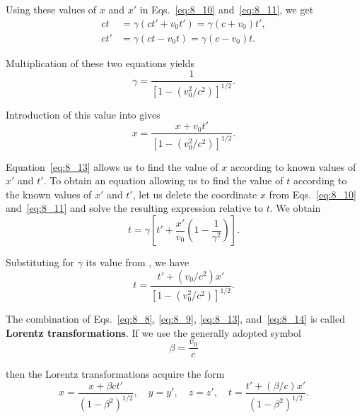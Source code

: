 \noindent
Using these values of $x$ and $x'$ in Eqs.~\eqref{eq:8_10} and~\eqref{eq:8_11}, we get
\begin{align*}
	ct  &= \gamma (ct' + v_0 t') = \gamma (c + v_0)t',\\
	ct' &= \gamma (ct - v_0 t) = \gamma (c - v_0)t.
\end{align*}

Multiplication of these two equations yields
\begin{equation}\label{eq:8_12}
	\gamma = \frac{1}{\left[1 - \left(v_0^2/c^2\right)\right]^{1/2}}.
\end{equation}

\noindent
Introduction of this value into  gives
\begin{equation}\label{eq:8_13}
	x = \frac{x + v_0 t'}{\left[1 - \left(v_0^2/c^2\right)\right]^{1/2}}.
\end{equation}

Equation~\eqref{eq:8_13} allows us to find the value of $x$ according to known values of $x'$ and $t'$. To obtain an equation allowing us to find the value of $t$ according to the known values of $x'$ and $t'$, let us delete the coordinate $x$ from Eqs.~\eqref{eq:8_10} and~\eqref{eq:8_11} and solve the resulting expression relative to $t$. We obtain
\begin{equation*}
	t = \gamma \left[t' + \frac{x'}{v_0}\left(1 - \frac{1}{\gamma^2}\right)\right].
\end{equation*}

\noindent
Substituting for $\gamma$ its value from , we have
\begin{equation}\label{eq:8_14}
	t = \frac{t' + (v_0/c^2) x'}{\left[1 - \left(v_0^2/c^2\right)\right]^{1/2}}.
\end{equation}

The combination of Eqs.~\eqref{eq:8_8}, \eqref{eq:8_9}, \eqref{eq:8_13}, and~\eqref{eq:8_14} is called \textbf{Lorentz transformations}. If we use the generally adopted symbol
\begin{equation}\label{eq:8_15}
	\beta = \frac{v_0}{c}
\end{equation}

\noindent
then the Lorentz transformations acquire the form
\begin{equation}\label{eq:8_16}
	x = \frac{x + \beta ct'}{\left(1 - \beta^2\right)^{1/2}},\quad y = y',\quad z = z',\quad t = \frac{t' + (\beta/c) x'}{\left(1 - \beta^2\right)^{1/2}}.
\end{equation}

